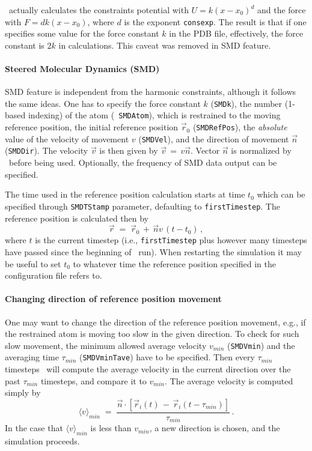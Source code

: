  \NAMD\ actually calculates the constraints
potential with $U = k (x-x_0)^d$ and the force with $F = d k (x-x_0)$,
where $d$ is the exponent {\tt consexp}. The result is that if one
specifies some value for the force constant $k$ in the PDB file,
effectively, the force constant is $2 k$ in calculations. This caveat
was removed in SMD feature.


\paragraph{Steered Molecular Dynamics (SMD)}

SMD feature is independent from the harmonic constraints, although it
follows the same ideas. One has to specify the force constant $k$
({\tt SMDk}), the number (1-based indexing) of the atom ({\tt
SMDAtom}), which is restrained to the moving reference position, the
initial reference position $\vec r_0$ ({\tt SMDRefPos}), the {\em
absolute} value of the velocity of movement $v$ ({\tt SMDVel}), and
the direction of movement $\vec n$ ({\tt SMDDir}). The velocity $\vec
v$ is then given by $\vec v \, = \, v \vec n$. Vector $\vec n$ is
normalized by \NAMD\ before being used. Optionally, the frequency of
SMD data output can be specified. 

The time used in the reference position calculation starts at time
$t_0$ which can be specified through {\tt SMDTStamp} parameter,
defaulting to {\tt firstTimestep}. The reference position is
calculated then by 
\begin{equation}
  \vec r \; = \; \vec r_0 \, + \, \vec n v \, (t - t_0) \, ,
\end{equation}
where $t$ is the current timestep (i.e., {\tt firstTimestep} plus
however many timesteps have passed since the beginning of \NAMD\ run).
When restarting the simulation it may be useful to set $t_0$ to 
whatever time the reference position specified in the configuration
file refers to.

\paragraph{Changing direction of reference position movement}

One may want to change the direction of the reference position
movement, e.g., if the restrained atom is moving too slow in the given
direction. To check for such slow movement, the minimum allowed
average velocity $v_{min}$ ({\tt SMDVmin}) and the averaging time
$\tau_{min}$ ({\tt SMDVminTave}) have to be specified. Then every
$\tau_{min}$ timesteps \NAMD\ will compute the average velocity in the
current direction over the past $\tau_{min}$ timesteps, and compare it
to $v_{min}$. The average velocity is computed simply by 
\begin{equation}
   \langle v\rangle_{min} \; = \; \frac{\vec n \cdot [\vec r_i(t) \, - \,
   	\vec r_i(t - \tau_{min}) ]}{\tau_{min}} \, .
\label{eq:smdvmin}
\end{equation}
In the case that $\langle v\rangle_{min}$ is less than $v_{min}$, 
a new direction is chosen, and the simulation proceeds. 

